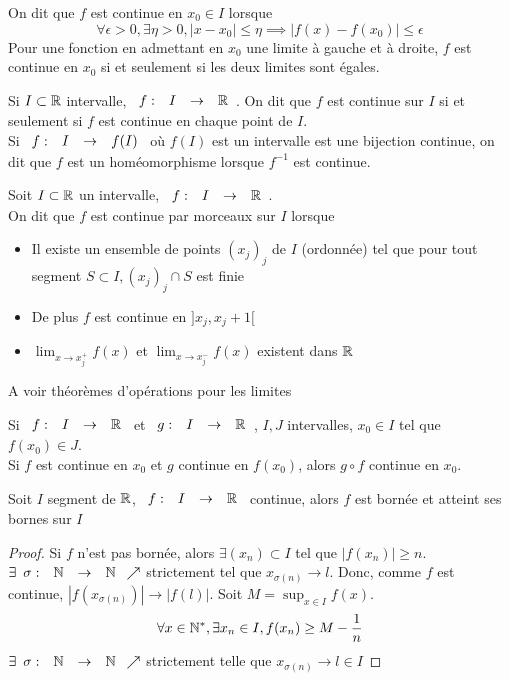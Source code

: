 \documentclass[]{report}
\begin{document}
\begin{df}
    On dit que $f$ est continue en $x_0\in I$ lorsque
    \[\forall \epsilon>0, \exists \eta >0, \left|x-x_0\right|\le \eta \implies \left|f(x) -f(x_0)\right|\le \epsilon\]
    Pour une fonction en admettant en $x_0$ une limite à gauche et à droite, $f$ est continue en $x_0$ si et seulement si les deux limites sont égales.
\end{df}

\begin{df}{}{}
    Si $I \subset \mathbb{R}$ intervalle, $\begin{array}{ccccc} f : & I & \to & \mathbb{R} \end{array}$. On dit que $f$ est continue sur $I$ si et seulement si $f$ est continue en chaque point de $I$.\\
    Si $\begin{array}{ccccc} f : & I & \to & f(I) \end{array}$ où $f(I)$ est un intervalle est une bijection continue, on dit que $f$ est un homéomorphisme lorsque $f^{-1}$ est continue.
\end{df}

\begin{df}{}{}
    Soit $I\subset \mathbb{R}$ un intervalle, $\begin{array}{ccccc} f : & I & \to & \mathbb{R} \end{array}$.\\
    On dit que $f$ est continue par morceaux sur $I$ lorsque
    \begin{itemize}
        \item Il existe un ensemble de points $(x_j)_j$ de $I$ (ordonnée) tel que pour tout segment $S\subset I, (x_j)_j\cap S$ est finie
        \item De plus $f$ est continue en $]x_j,x_j+1[$
        \item $\lim_{x\to x_j^+} f(x)$ et $\lim_{x\to x_j^-} f(x)$ existent dans $\mathbb{R}$
    \end{itemize}
\end{df}

A voir théorèmes d'opérations pour les limites

\begin{ra}{}{}
    Si $\begin{array}{ccccc} f : & I & \to & \mathbb{R} \end{array}$ et $\begin{array}{ccccc} g : & I & \to & \mathbb{R} \end{array}$, $I,J$ intervalles, $x_0\in I$ tel que $f(x_0)\in J$.\\
    Si $f$ est continue en $x_0$ et $g$ continue en $f(x_0)$, alors $g\circ f$ continue en $x_0$.
\end{ra}

\begin{prop}{}{}
    Soit $I$ segment de $\mathbb{R}$, $\begin{array}{ccccc} f : & I & \to & \mathbb{R} \end{array}$ continue, alors $f$ est bornée et atteint ses bornes sur $I$
\end{prop}

\begin{proof}
    Si $f$ n'est pas bornée, alors $\exists(x_n) \subset I$ tel que $\left| f(x_n)\right|\ge n$.\\
    $\exists \begin{array}{ccccc} \sigma : & \mathbb{N} & \to & \mathbb{N} \end{array} \nearrow$ strictement tel que $x_{\sigma(n)}\to l$. Donc, comme $f$ est continue, $\left| f(x_{\sigma(n)})\right| \to \left| f(l)\right|$. Soit $M=\sup_{x\in I} f(x)$.
    \[\forall x\in \mathbb{N}^*,\exists x_n\in I, f(x_n)\ge M-\frac{1}{n}\]
    $\exists \begin{array}{ccccc} \sigma : & \mathbb{N} & \to & \mathbb{N} \end{array} \nearrow $ strictement telle que $x_{\sigma(n)}\to l \in I$
\end{proof}
\end{document}
